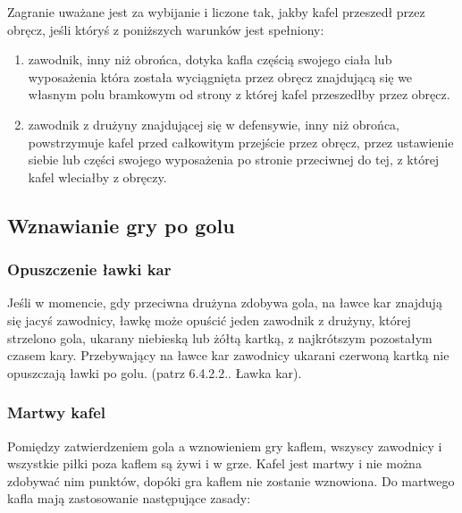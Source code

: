 \documentclass[12pt]{article}
\begin{document}
Zagranie uważane jest za wybijanie i liczone tak, jakby kafel przeszedł
przez obręcz, jeśli któryś z poniższych warunków jest spełniony:

\begin{enumerate}
\item
    zawodnik, inny niż obrońca, dotyka kafla częścią swojego ciała lub
  wyposażenia która została wyciągnięta przez obręcz znajdującą się we
  własnym polu bramkowym od strony z której kafel przeszedłby przez
  obręcz.
  \item
    zawodnik z drużyny znajdującej się w defensywie, inny niż obrońca,
  powstrzymuje kafel przed całkowitym przejście przez obręcz, przez
  ustawienie siebie lub części swojego wyposażenia po stronie przeciwnej
  do tej, z której kafel wleciałby z obręczy.
  \end{enumerate}

\subsection{Wznawianie gry po golu}

\subsubsection{Opuszczenie ławki kar}
Jeśli w momencie, gdy przeciwna
drużyna zdobywa gola, na ławce kar znajdują się jacyś zawodnicy, ławkę
może opuścić jeden zawodnik z drużyny, której strzelono gola, ukarany
niebieską lub żółtą kartką, z najkrótszym pozostałym czasem kary.
Przebywający na ławce kar zawodnicy ukarani czerwoną kartką nie
opuszczają ławki po golu. (patrz 6.4.2.2.. Ławka kar).

\subsubsection{Martwy kafel}
Pomiędzy zatwierdzeniem gola a wznowieniem
gry kaflem, wszyscy zawodnicy i wszystkie piłki poza kaflem są żywi i w
grze. Kafel jest martwy i nie można zdobywać nim punktów, dopóki gra
kaflem nie zostanie wznowiona. Do martwego kafla mają zastosowanie
następujące zasady:
\end{document}
